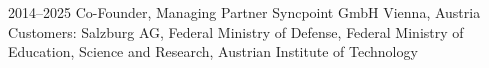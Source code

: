 \cventry
{2014--2025}
{Co-Founder, Managing Partner}
{}
{Syncpoint GmbH}
{Vienna, Austria}
{
  Customers: Salzburg AG,
  Federal Ministry of Defense,
  Federal Ministry of Education, Science and Research,
  Austrian Institute of Technology
}
